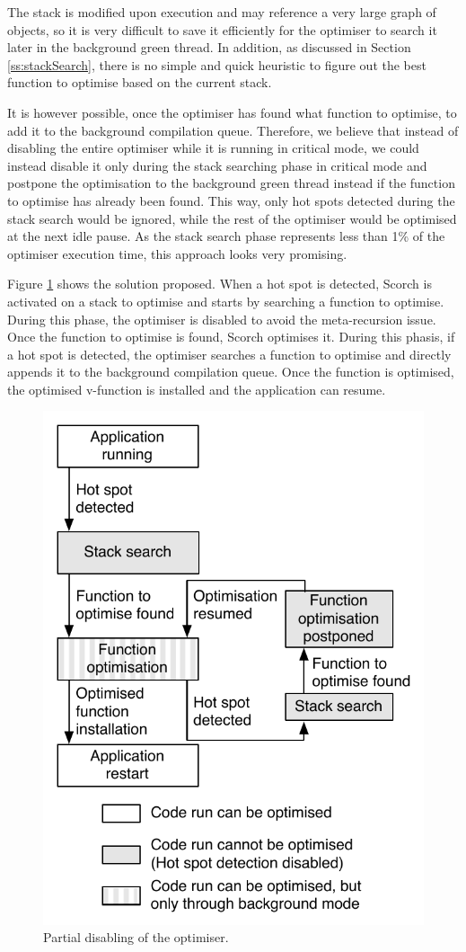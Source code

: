 \documentclass[a4paper,12pt,twoside]{../includes/ThesisStyle}
\begin{document}
The stack is modified upon execution and may reference a very large graph of objects, so it is very difficult to save it efficiently for the optimiser to search it later in the background green thread. In addition, as discussed in Section \ref{ss:stackSearch}, there is no simple and quick heuristic to figure out the best function to optimise based on the current stack. 

It is however possible, once the optimiser has found what function to optimise, to add it to the background compilation queue. Therefore, we believe that instead of disabling the entire optimiser while it is running in critical mode, we could instead disable it only during the stack searching phase in critical mode and postpone the optimisation to the background green thread instead if the function to optimise has already been found. This way, only hot spots detected during the stack search would be ignored, while the rest of the optimiser would be optimised at the next idle pause. As the stack search phase represents less than 1\% of the optimiser execution time, this approach looks very promising.

Figure \ref{fig:PartialDisabling} shows the solution proposed. When a hot spot is detected, Scorch is activated on a stack to optimise and starts by searching a function to optimise. During this phase, the optimiser is disabled to avoid the meta-recursion issue. Once the function to optimise is found, Scorch optimises it. During this phasis, if a hot spot is detected, the optimiser searches a function to optimise and directly appends it to the background compilation queue. Once the function is optimised, the optimised v-function is installed and the application can resume.

\begin{figure}[h!]
    \begin{center}
        \includegraphics[width=0.55\linewidth]{PartialDisabling}
        \caption{Partial disabling of the optimiser.}
        \label{fig:PartialDisabling}
    \end{center}
\end{figure}
\end{document}

